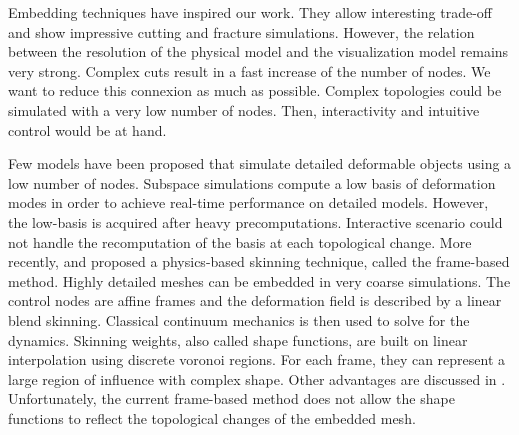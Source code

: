 Embedding techniques have inspired our work. They allow interesting trade-off and show impressive cutting and fracture simulations. However, the relation between the resolution of the physical model and the visualization model remains very strong. Complex cuts result in a fast increase of the number of nodes. We want to reduce this connexion as much as possible. Complex topologies could be simulated with a very low number of nodes. Then, interactivity and intuitive control would be at hand.

Few models have been proposed that simulate detailed deformable objects using a low number of nodes. Subspace simulations \cite{Barbic2005} compute a low basis of deformation modes in order to achieve real-time performance on detailed models. However, the low-basis is acquired after heavy precomputations. Interactive scenario could not handle the recomputation of the basis at each topological change. More recently, \cite{Gilles2011} and \cite{Faure2011} proposed a physics-based skinning technique, called the frame-based method. Highly detailed meshes can be embedded in very coarse simulations. The control nodes are affine frames and the deformation field is described by a linear blend skinning. Classical continuum mechanics is then used to solve for the dynamics. Skinning weights, also called shape functions, are built on linear interpolation using discrete voronoi regions. For each frame, they can represent a large region of influence with complex shape. Other advantages are discussed in \cite{Faure2011}. Unfortunately, the current frame-based method does not allow the shape functions to reflect the topological changes of the embedded mesh.

